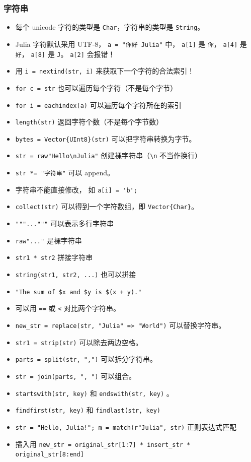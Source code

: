 \subsubsection{字符串}
\begin{itemize}
\item 每个 unicode 字符的类型是 \verb`Char`，字符串的类型是 \verb`String`。
\item Julia 字符默认采用 UTF-8， \verb`a = "你好 Julia"` 中， \verb`a[1]` 是 \verb`你`， \verb`a[4]` 是 \verb`好`， \verb`a[8]` 是 \verb`J`。 \verb`a[2]` 会报错！
\item 用 \verb`i = nextind(str, i)` 来获取下一个字符的合法索引！
\item \verb`for c = str` 也可以遍历每个字符（不是每个字节）
\item \verb`for i = eachindex(a)` 可以遍历每个字符所在的索引
\item \verb`length(str)` 返回字符个数（不是每个字节数）
\item \verb`bytes = Vector{UInt8}(str)` 可以把字符串转换为字节。
\item \verb`str = raw"Hello\nJulia"` 创建裸字符串（\verb`\n` 不当作换行）
\item \verb`str *= "字符串"` 可以 append。
\item 字符串不能直接修改， 如 \verb`a[i] = 'b';`
\item \verb`collect(str)` 可以得到一个字符数组，即 \verb`Vector{Char}`。
\item \verb`"""..."""` 可以表示多行字符串
\item \verb`raw"..."` 是裸字符串
\item \verb`str1 * str2` 拼接字符串
\item \verb`string(str1, str2, ...)` 也可以拼接
\item \verb`"The sum of $x and $y is $(x + y)."`
\item 可以用 \verb`==` 或 \verb`<` 对比两个字符串。
\item \verb`new_str = replace(str, "Julia" => "World")` 可以替换字符串。
\item \verb`str1 = strip(str)` 可以除去两边空格。
\item \verb`parts = split(str, ",")` 可以拆分字符串。
\item \verb`str = join(parts, ", ")` 可以组合。
\item \verb`startswith(str, key)` 和 \verb`endswith(str, key)` 。
\item \verb`findfirst(str, key)` 和 \verb`findlast(str, key)`
\item \verb`str = "Hello, Julia!"; m = match(r"Julia", str)` 正则表达式匹配
\item 插入用 \verb`new_str = original_str[1:7] * insert_str * original_str[8:end]`
\end{itemize}

